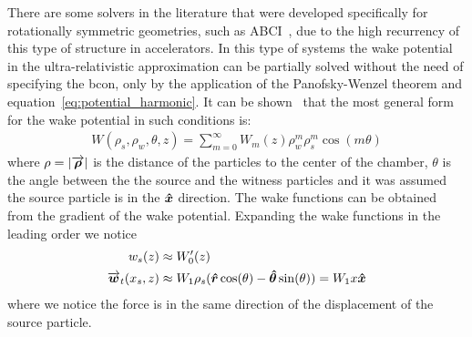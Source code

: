     There are some solvers in the literature that were developed specifically for rotationally symmetric geometries, such as ABCI~\cite{Chin1994a}, due to the high recurrency of this type of structure in accelerators. In this type of systems the wake potential in the ultra-relativistic approximation can be partially solved without the need of specifying the \gls{bcon}, only by the application of the Panofsky-Wenzel theorem and equation~\eqref{eq:potential_harmonic}. It can be shown~\cite{Stupakov2000a} that the most general form for the wake potential in such conditions is:
    \begin{align}
	       W(\rho_s, \rho_w, \theta, z) = \sum_{m=0}^\infty W_m(z) \rho_w^m\rho_s^m\cos(m\theta)
    \end{align}
    where $\rho = |\overrightarrow{\boldsymbol{\rho}}|$ is the distance of the particles to the center of the chamber, $\theta$ is the angle between the the source and the witness particles and it was assumed the source particle is in the $\boldsymbol{\hat x}$ direction. The wake functions can be obtained from the gradient of the wake potential. Expanding the wake functions in the leading order we notice
    \begin{align}
	    w_s(z) &\approx W'_0(z)\\
	    \overrightarrow{\boldsymbol{w}}_t(x_s, z) &\approx W_1\rho_s(\boldsymbol{\hat r}\cos(\theta)-\boldsymbol{\hat\theta}\sin(\theta)) =
						W_1x\boldsymbol{\hat x}
    \end{align}
    where we notice the force is in the same direction of the displacement of the source particle.

